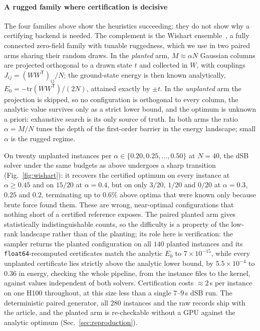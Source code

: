\documentclass[preprint,12pt,a4paper]{elsarticle}
\begin{document}
\paragraph{A rugged family where certification is decisive}
The four families above show the heuristics succeeding; they do not show why a certifying
backend is needed. The complement is the Wishart ensemble~\cite{hamze2020wishart}, a fully
connected zero-field family with tunable ruggedness, which we use in two paired arms sharing
their random draws. In the \emph{planted} arm, $M \approx \alpha N$ Gaussian columns are
projected orthogonal to a drawn state $t$ and collected in $W$, with couplings
$J_{ij}=(WW^{\mathsf{T}})_{ij}/N$; the ground-state energy is then known analytically,
$E_0=-\mathrm{tr}(WW^{\mathsf{T}})/(2N)$, attained exactly by $\pm t$. In the
\emph{unplanted} arm the projection is skipped, so no configuration is orthogonal to every
column, the analytic value survives only as a strict lower bound, and the optimum is unknown
a priori: exhaustive search is its only source of truth. In both arms the ratio
$\alpha=M/N$ tunes the depth of the first-order barrier in the energy landscape; small
$\alpha$ is the rugged regime.

On twenty unplanted instances per $\alpha\in\{0.20,0.25,\dots,0.50\}$ at $N=40$, the dSB
solver under the same budgets as above undergoes a sharp transition
(Fig.~\ref{fig:wishart}): it recovers the certified optimum on every instance at
$\alpha\geq0.45$ and on $15/20$ at $\alpha=0.4$, but on only $3/20$, $1/20$ and $0/20$ at
$\alpha=0.3$, $0.25$ and $0.2$, terminating up to $0.6\%$ above optima that were known only
because brute force found them. These are wrong, near-optimal configurations that nothing
short of a certified reference exposes. The paired planted arm gives statistically indistinguishable
counts, so the difficulty is a property of the low-rank landscape rather than of the
planting; its role here is verification: the sampler returns the planted configuration on
all $140$ planted instances and its \texttt{float64}-recomputed certificates match the
analytic $E_0$ to $7\times10^{-15}$, while every unplanted certificate lies strictly above
the analytic lower bound, by $5.5\times10^{-4}$ to $0.36$ in energy, checking the whole
pipeline, from the instance files to the kernel, against values independent of both solvers.
Certification costs $\approx\!2$\,s per instance on one H100 throughout, at this size less
than a single $7$--$9$\,s dSB run. The deterministic paired generator, all $280$ instances
and the raw records ship with the article, and the planted arm is re-checkable without a GPU
against the analytic optimum (Sec.~\ref{sec:reproduction}).
\end{document}
